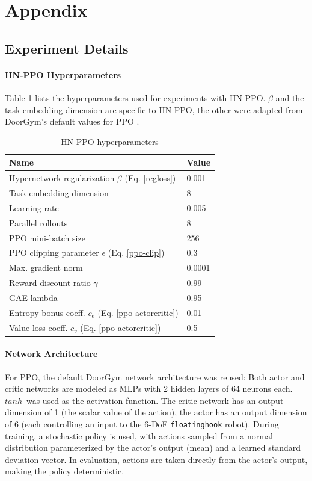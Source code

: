 \documentclass[dvipsnames]{article} %
\begin{document}



\appendix
\section{Appendix}
\subsection{Experiment Details}
\paragraph{HN-PPO Hyperparameters}
Table \ref{tab:hnppo-hparams} lists the hyperparameters used for experiments with HN-PPO. $\beta$ and the task embedding dimension are specific to HN-PPO, the other were adapted from DoorGym's default values for PPO \citep{doorgym}. 

\begin{table}[htbp]
\caption{HN-PPO hyperparameters}
\label{tab:hnppo-hparams}
\begin{center}
\begin{tabular}{@{}ll@{}}
\toprule
Name & Value \\ 
\midrule
Hypernetwork regularization $\beta$ (Eq. \ref{regloss})& 0.001 \\
Task embedding dimension & 8 \\
Learning rate & 0.005 \\
Parallel rollouts & 8 \\
PPO mini-batch size & 256 \\
PPO clipping parameter $\epsilon$ (Eq. \ref{ppo-clip}) & 0.3 \\
Max. gradient norm & 0.0001 \\
Reward discount ratio $\gamma$ & 0.99\\
GAE lambda & 0.95\\
Entropy bonus coeff. $c_e$ (Eq. \ref{ppo-actorcritic}) & 0.01\\
Value loss coeff. $c_v$ (Eq. \ref{ppo-actorcritic}) &  0.5\\
\bottomrule
\end{tabular}
\end{center}
\end{table}


\paragraph{Network Architecture}
\label{chap:architecture}
For PPO, the default DoorGym network architecture was reused: Both actor and critic networks are modeled as MLPs with 2 hidden layers of 64 neurons each. $tanh$~was used as the activation function. The critic network has an output dimension of 1 (the scalar value of the action), the actor has an output dimension of 6 (each controlling an input to the 6-DoF \texttt{floatinghook} robot). During training, a stochastic policy is used, with actions sampled from a normal distribution parameterized by the actor's output (mean) and a learned standard deviation vector. In evaluation, actions are taken directly from the actor's output, making the policy deterministic.
\end{document}
